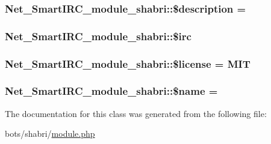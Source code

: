 \subsubsection[{\texorpdfstring{\$description}{$description}}]{\setlength{\rightskip}{0pt plus 5cm}Net\+\_\+\+Smart\+I\+R\+C\+\_\+module\+\_\+shabri\+::\$description = \textquotesingle{}\textquotesingle{}}\hypertarget{classNet__SmartIRC__module__shabri_af61d6f8235505952dbe0922ce1524412}{}\label{classNet__SmartIRC__module__shabri_af61d6f8235505952dbe0922ce1524412}
\subsubsection[{\texorpdfstring{\$irc}{$irc}}]{\setlength{\rightskip}{0pt plus 5cm}Net\+\_\+\+Smart\+I\+R\+C\+\_\+module\+\_\+shabri\+::\$irc\hspace{0.3cm}{\ttfamily [private]}}\hypertarget{classNet__SmartIRC__module__shabri_a6f5d61be96fc20ee5ffc8d07ccb2d578}{}\label{classNet__SmartIRC__module__shabri_a6f5d61be96fc20ee5ffc8d07ccb2d578}
\subsubsection[{\texorpdfstring{\$license}{$license}}]{\setlength{\rightskip}{0pt plus 5cm}Net\+\_\+\+Smart\+I\+R\+C\+\_\+module\+\_\+shabri\+::\$license = \textquotesingle{}M\+IT\textquotesingle{}}\hypertarget{classNet__SmartIRC__module__shabri_a08fcbcccb2c24469862e98cba1911049}{}\label{classNet__SmartIRC__module__shabri_a08fcbcccb2c24469862e98cba1911049}
\subsubsection[{\texorpdfstring{\$name}{$name}}]{\setlength{\rightskip}{0pt plus 5cm}Net\+\_\+\+Smart\+I\+R\+C\+\_\+module\+\_\+shabri\+::\$name = \textquotesingle{}\textquotesingle{}}\hypertarget{classNet__SmartIRC__module__shabri_a03db7b1894653334db45217284781a32}{}\label{classNet__SmartIRC__module__shabri_a03db7b1894653334db45217284781a32}


The documentation for this class was generated from the following file\+:\begin{DoxyCompactItemize}
\item 
bots/shabri/\hyperlink{shabri_2module_8php}{module.\+php}\end{DoxyCompactItemize}
